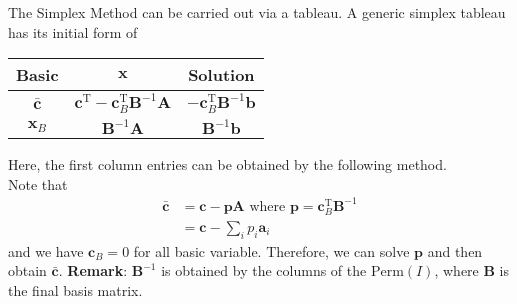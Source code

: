 \documentclass[12pt]{article}
\newcommand{\T}{\mathrm{T}}
\theoremstyle{definition}
\DeclareMathOperator{\x}{\mathbf{x}}
\begin{document}
The Simplex Method can be carried out via a tableau. A generic simplex tableau has its initial form of
\begin{table}[h]
\centering
\begin{tabular}{|c|c|c|}
\hline
Basic   &$\x$ &Solution\\\hline
$\bar{\mathbf{c}}$&$\mathbf{c}^\T - \mathbf{c}_B^\T\mathbf{B}^{-1}\mathbf{A}$&$-\mathbf{c}_B^\T\mathbf{B}^{-1}\mathbf{b}$\\\hline
$\x_B$&$\mathbf{B}^{-1}\mathbf{A}$&$\mathbf{B}^{-1}\mathbf{b}$\\\hline
\end{tabular}
\end{table}
Here, the first column entries can be obtained by the following method.\\
Note that \begin{align*}
\bar{\mathbf{c}}&=\mathbf{c}-\mathbf{pA}\text{ where }\mathbf{p}=\mathbf{c}_B^\T\mathbf{B}^{-1}\\
&=\mathbf{c}-\sum_{i} p_i\mathbf{a}_i
\end{align*}
and we have $\mathbf{c}_B=0$ for all basic variable. Therefore, we can solve $\mathbf{p}$ and then obtain $\bar{\mathbf{c}}$.
\textbf{Remark}: $\mathbf{B}^{-1}$ is obtained by the columns of the $\text{Perm}(I)$, where $\mathbf{B}$ is the final basis matrix.
\end{document}
